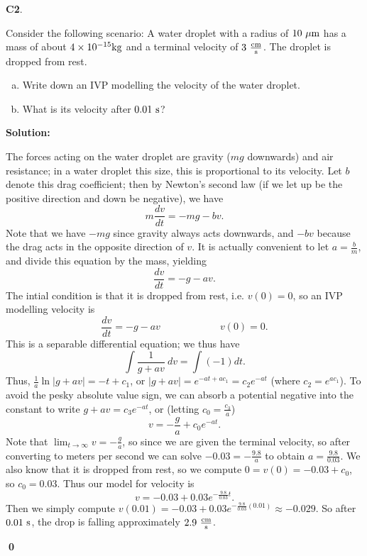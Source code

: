 \documentclass{article}
\newenvironment{problem}[1]
{
  \begin{flushleft}
  \textbf{#1}.
  \ignorespaces
}
{
  \end{flushleft}
}
\newenvironment{solution}
{
  \ignorespaces
  \textbf{Solution:}
}
{
  \ignorespacesafterend
  \begin{flushright}
  {\bfseries \qed}
  \end{flushright}
}
\begin{document}








\begin{problem}{C2}
Consider the following scenario: 
A water droplet with a radius of \(10\ {\rm \mu m}\) has a mass of about \(4 \times 10^{-15} {\rm kg}\) and a terminal velocity of \(3\ {\rm \frac{cm}{s}}\).  The droplet is dropped from rest.  
\begin{enumerate}[(a)]
\item Write down an IVP modelling the velocity of the water droplet.
\item What is its velocity after \(0.01\ {\rm s}\)?
\end{enumerate}
\end{problem}
\begin{solution}
The forces acting on the water droplet are gravity (\(mg\) downwards) and air resistance; in a water droplet this size, this is proportional to its velocity.  Let \(b\) denote this drag coefficient; then by Newton's second law (if we let up be the positive direction and down be negative), we have
\[ m \frac{dv}{dt} = -mg - bv .\]
Note that we have \(-mg\) since gravity always acts downwards, and \(-bv\) because the drag acts in the opposite direction of \(v\).
It is actually convenient to let \(a=\frac{b}{m}\), and divide this equation by the mass, yielding 
\[ \frac{dv}{dt} = -g - av .\]
The intial condition is that it is dropped from rest, i.e. \(v(0)=0\), so an IVP modelling velocity is 
\[  \frac{dv}{dt} = -g - av \hspace{6em} v(0)=0 .\]
This is a separable differential equation; we thus have
\[ \int \frac{1}{g+av}\ dv = \int (-1)dt .\]
Thus, \(\frac{1}{a}\ln|g+av| = -t+c_1\), or \(|g+av| = e^{-at+ac_1}=c_2e^{-at}\) (where \(c_2=e^{ac_1}\)).  To avoid the pesky absolute value sign, we can absorb a potential negative into the constant to write \(g+av=c_3 e^{-at}\), or (letting \(c_0=\frac{c_3}{a}\))
\[ v=-\frac{g}{a} +c_0 e^{-at}.\]
Note that \(\lim _{t \rightarrow \infty} v = -\frac{g}{a}\), so since we are given the terminal velocity, so after converting to meters per second we can solve \(-0.03 = -\frac{9.8}{a}\) to obtain \(a=\frac{9.8}{0.03}\).  We also know that it is dropped from rest, so we compute \(0=v(0)=-0.03+c_0\), so \(c_0=0.03\).  Thus our model for velocity is 
\[ v=-0.03+0.03e^{-\frac{9.8}{0.03} t}.\]
Then we simply compute \(v(0.01)=-0.03+0.03e^{-\frac{9.8}{0.03} (0.01)} \approx -0.029 \).  So after \(0.01\ {\rm s}\), the drop is falling approximately  \(2.9\ {\rm \frac{cm}{s}}\).
\end{solution}
\end{document}

